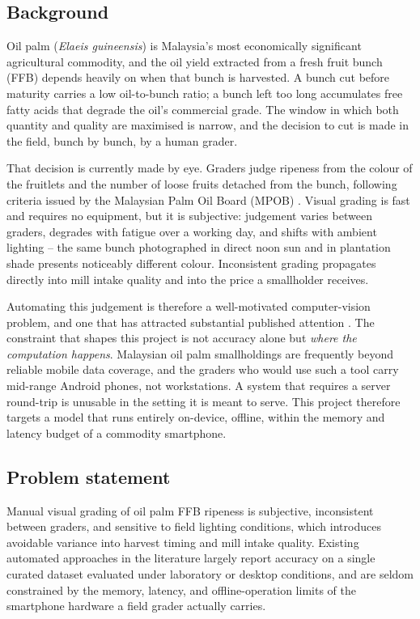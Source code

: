 \documentclass{article}
\begin{document}
\subsection{Background}

Oil palm (\textit{Elaeis guineensis}) is Malaysia's most economically significant agricultural commodity,
and the oil yield extracted from a fresh fruit bunch (FFB) depends heavily on when that bunch is harvested.
A bunch cut before maturity carries a low oil-to-bunch ratio; a bunch left too long accumulates free fatty
acids that degrade the oil's commercial grade. The window in which both quantity and quality are maximised
is narrow, and the decision to cut is made in the field, bunch by bunch, by a human grader.

That decision is currently made by eye. Graders judge ripeness from the colour of the fruitlets and the
number of loose fruits detached from the bunch, following criteria issued by the Malaysian Palm Oil Board
(MPOB) \citep{mpob2023grading}. Visual grading is fast and requires no equipment, but it is subjective:
judgement varies between graders, degrades with fatigue over a working day, and shifts with ambient
lighting -- the same bunch photographed in direct noon sun and in plantation shade presents noticeably
different colour. Inconsistent grading propagates directly into mill intake quality and into the price a
smallholder receives.

Automating this judgement is therefore a well-motivated computer-vision problem, and one that has
attracted substantial published attention \citep{suharjito2021mobile,herman2020visualattention}. The
constraint that shapes this project is not accuracy alone but \textit{where the computation happens}.
Malaysian oil palm smallholdings are frequently beyond reliable mobile data coverage, and the graders who
would use such a tool carry mid-range Android phones, not workstations. A system that requires a server
round-trip is unusable in the setting it is meant to serve. This project therefore targets a model that
runs entirely on-device, offline, within the memory and latency budget of a commodity smartphone.

\subsection{Problem statement}

Manual visual grading of oil palm FFB ripeness is subjective, inconsistent between graders, and sensitive
to field lighting conditions, which introduces avoidable variance into harvest timing and mill intake
quality. Existing automated approaches in the literature largely report accuracy on a single curated
dataset evaluated under laboratory or desktop conditions, and are seldom constrained by the memory,
latency, and offline-operation limits of the smartphone hardware a field grader actually carries.
\end{document}
